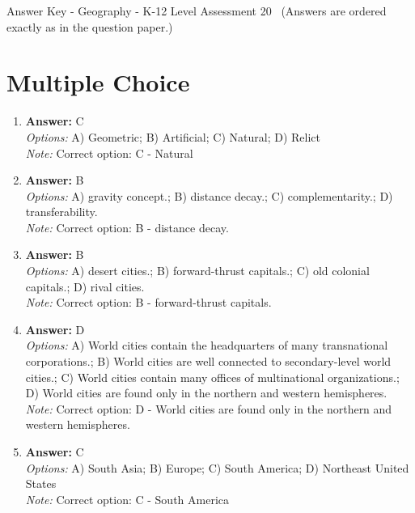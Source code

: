 \documentclass[12pt]{article}
\begin{document}
\begin{center}
Answer Key - Geography - K-12 Level Assessment 20 \
\small (Answers are ordered exactly as in the question paper.)
\end{center}

\section*{Multiple Choice}
\begin{enumerate}[label=\arabic*.]
\item \textbf{Answer:} C
\\ \textit{Options:} A) Geometric; B) Artificial; C) Natural; D) Relict
\\ \textit{Note:} Correct option: C - Natural
\item \textbf{Answer:} B
\\ \textit{Options:} A) gravity concept.; B) distance decay.; C) complementarity.; D) transferability.
\\ \textit{Note:} Correct option: B - distance decay.
\item \textbf{Answer:} B
\\ \textit{Options:} A) desert cities.; B) forward-thrust capitals.; C) old colonial capitals.; D) rival cities.
\\ \textit{Note:} Correct option: B - forward-thrust capitals.
\item \textbf{Answer:} D
\\ \textit{Options:} A) World cities contain the headquarters of many transnational corporations.; B) World cities are well connected to secondary-level world cities.; C) World cities contain many offices of multinational organizations.; D) World cities are found only in the northern and western hemispheres.
\\ \textit{Note:} Correct option: D - World cities are found only in the northern and western hemispheres.
\item \textbf{Answer:} C
\\ \textit{Options:} A) South Asia; B) Europe; C) South America; D) Northeast United States
\\ \textit{Note:} Correct option: C - South America
\end{enumerate}
\end{document}
